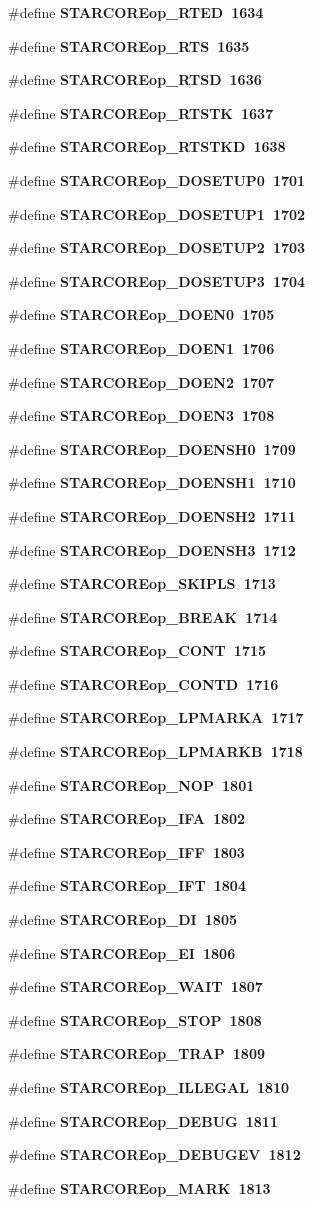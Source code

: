 \begin{CompactItemize}
\item 
\#define \bf{STARCOREop\_\-RTED}~1634
\item 
\#define \bf{STARCOREop\_\-RTS}~1635
\item 
\#define \bf{STARCOREop\_\-RTSD}~1636
\item 
\#define \bf{STARCOREop\_\-RTSTK}~1637
\item 
\#define \bf{STARCOREop\_\-RTSTKD}~1638
\item 
\#define \bf{STARCOREop\_\-DOSETUP0}~1701
\item 
\#define \bf{STARCOREop\_\-DOSETUP1}~1702
\item 
\#define \bf{STARCOREop\_\-DOSETUP2}~1703
\item 
\#define \bf{STARCOREop\_\-DOSETUP3}~1704
\item 
\#define \bf{STARCOREop\_\-DOEN0}~1705
\item 
\#define \bf{STARCOREop\_\-DOEN1}~1706
\item 
\#define \bf{STARCOREop\_\-DOEN2}~1707
\item 
\#define \bf{STARCOREop\_\-DOEN3}~1708
\item 
\#define \bf{STARCOREop\_\-DOENSH0}~1709
\item 
\#define \bf{STARCOREop\_\-DOENSH1}~1710
\item 
\#define \bf{STARCOREop\_\-DOENSH2}~1711
\item 
\#define \bf{STARCOREop\_\-DOENSH3}~1712
\item 
\#define \bf{STARCOREop\_\-SKIPLS}~1713
\item 
\#define \bf{STARCOREop\_\-BREAK}~1714
\item 
\#define \bf{STARCOREop\_\-CONT}~1715
\item 
\#define \bf{STARCOREop\_\-CONTD}~1716
\item 
\#define \bf{STARCOREop\_\-LPMARKA}~1717
\item 
\#define \bf{STARCOREop\_\-LPMARKB}~1718
\item 
\#define \bf{STARCOREop\_\-NOP}~1801
\item 
\#define \bf{STARCOREop\_\-IFA}~1802
\item 
\#define \bf{STARCOREop\_\-IFF}~1803
\item 
\#define \bf{STARCOREop\_\-IFT}~1804
\item 
\#define \bf{STARCOREop\_\-DI}~1805
\item 
\#define \bf{STARCOREop\_\-EI}~1806
\item 
\#define \bf{STARCOREop\_\-WAIT}~1807
\item 
\#define \bf{STARCOREop\_\-STOP}~1808
\item 
\#define \bf{STARCOREop\_\-TRAP}~1809
\item 
\#define \bf{STARCOREop\_\-ILLEGAL}~1810
\item 
\#define \bf{STARCOREop\_\-DEBUG}~1811
\item 
\#define \bf{STARCOREop\_\-DEBUGEV}~1812
\item 
\#define \bf{STARCOREop\_\-MARK}~1813
\end{CompactItemize}
